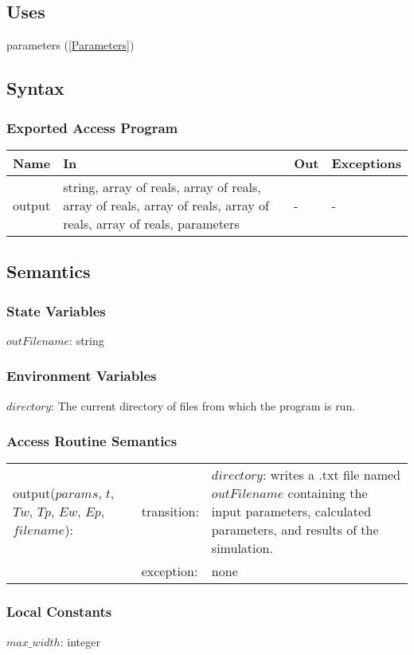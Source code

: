 \documentclass[12pt]{article}
\begin{document}
\subsection{Uses}
parameters (\ref{Parameters})
\subsection{Syntax}
\subsubsection{Exported Access Program}
\begin{center}
\begin{tabular}{p{3cm} p{7cm} p{2cm} p{2cm}}
\hline
\textbf{Name} & \textbf{In} & \textbf{Out} & \textbf{Exceptions} \\
\hline
output & string, array of reals, array of reals, array of reals, array of reals, array of reals, array of reals, parameters & - & - \\
\hline
\end{tabular}
\end{center}
\subsection{Semantics}
\subsubsection{State Variables}
$outFilename$: string
\subsubsection{Environment Variables}
$directory$: The current directory of files from which the program is run.
\subsubsection{Access Routine Semantics}
\begin{center}
\begin{tabular}{l l p{5cm}}
output($params$, $t$, $Tw$, $Tp$, $Ew$, $Ep$, $filename$): & transition: & $directory$: writes a .txt file named $outFilename$ containing the input parameters, calculated parameters, and results of the simulation. \\
& exception: & none \\
\end{tabular}
\end{center}
\subsubsection{Local Constants}
$max\_width$: integer
\end{document}
